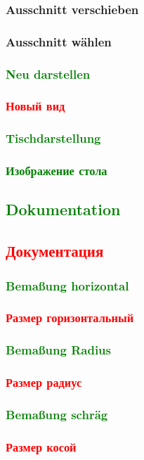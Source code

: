 \documentclass[14pt,a4paper]{book}
\newcommand{\DE}[1]{\textcolor{green}{#1}}
\newcommand{\RU}[1]{\textcolor{red}{#1}}
\begin{document}
			\subsubsection{Ausschnitt verschieben} 
			\subsubsection{Ausschnitt wählen} 
			\DE{\subsubsection{Neu darstellen}} 
			\RU{\subsubsection{Новый вид}} 
			\DE{\subsubsection{Tischdarstellung}}
			\DE{\subsubsection{Изображение стола}}
		\DE{\subsection{Dokumentation}}
		\RU{\subsection{Документация}}
			\DE{\subsubsection{Bemaßung horizontal}}
			\RU{\subsubsection{Размер горизонтальный}}
			\DE{\subsubsection{Bemaßung Radius}}
			\RU{\subsubsection{Размер радиус}}
			\DE{\subsubsection{Bemaßung schräg}}
			\RU{\subsubsection{Размер косой}}
\end{document}
